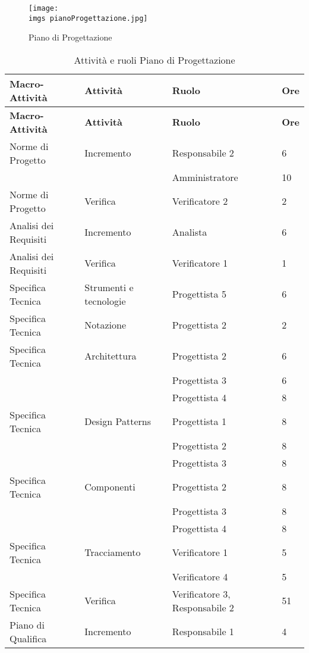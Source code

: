 {{	\begin{figure}[H]
		\texttt{[image: \\imgs pianoProgettazione.jpg]}
		\label{fig:pianoprogettazione}
		\caption{Piano di Progettazione}
	\end{figure}
	
	\renewcommand*{\arraystretch}{1.4}
	\begin{longtable} [c]{| l | l | l | l |}
		\caption{Attività e ruoli Piano di Progettazione \label{tab:pianoprogettazione}}\\
		 \hline
		 \textbf{Macro-Attività} & \textbf{Attività} & \textbf{Ruolo} & \textbf{Ore}\\
		 \hline
		 \endfirsthead
		 \hline
		 \textbf{Macro-Attività} & \textbf{Attività} & \textbf{Ruolo} & \textbf{Ore}\\
		 \hline
			\endhead
		 \hline
		 \endfoot
		 \hline
		 \endlastfoot
		 Norme di Progetto & Incremento & Responsabile 2 & 6\\
		 &	&	Amministratore & 10\\
		 Norme di Progetto & Verifica & Verificatore 2 & 2 \\
		 Analisi dei Requisiti & Incremento & Analista & 6 \\
		 Analisi dei Requisiti & Verifica & Verificatore 1 & 1 \\
		 Specifica Tecnica & Strumenti e tecnologie & Progettista 5 & 6 \\
		 Specifica Tecnica & Notazione & Progettista 2 & 2 \\
		 Specifica Tecnica & Architettura & Progettista 2 & 6\\
		 &	&	Progettista 3 & 6\\
		 &	&	Progettista 4 & 8\\
		 Specifica Tecnica & Design Patterns & Progettista 1 & 8\\
		 &	&	Progettista 2 & 8\\
		 &	&	Progettista 3 & 8\\
		 Specifica Tecnica & Componenti & Progettista 2 & 8\\
		 &	&	Progettista 3 & 8\\
		 &	&	Progettista 4 & 8\\
		 Specifica Tecnica & Tracciamento & Verificatore 1 & 5\\
		 &	&	Verificatore 4 & 5\\
		Specifica Tecnica & Verifica & Verificatore 3, Responsabile 2 & 51 \\
		Piano di Qualifica & Incremento & Responsabile 1 & 4 \\

\end{longtable}}}
